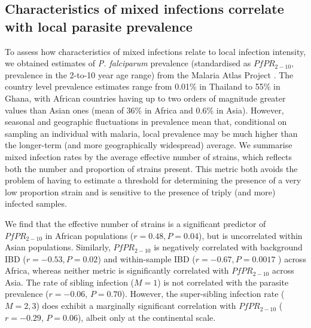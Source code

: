 \documentclass[9pt,lineno]{elife}
\begin{document}
\subsection{Characteristics of mixed infections correlate with local parasite prevalence}

To assess how characteristics of mixed infections relate to local infection intensity, we obtained estimates of {\it P. falciparum} prevalence (standardised as $PfPR_{2-10}$, prevalence in the 2-to-10 year age range) from the Malaria Atlas Project \citep[see Table~\ref{tab:Pf3k}]{MAP2017}. The country level prevalence estimates range from 0.01\% in Thailand to 55\% in Ghana, with African countries having up to two orders of magnitude greater values than Asian ones (mean of 36\% in Africa and 0.6\% in Asia). However, seasonal and geographic fluctuations in prevalence mean that, conditional on sampling an individual with malaria, local prevalence may be much higher than the longer-term (and more geographically widespread) average. We summarise mixed infection rates by the average effective number of strains, which reflects both the number and proportion of strains present.  This metric both avoids the problem of having to estimate a threshold for determining the presence of a very low proportion strain and is sensitive to the presence of triply (and more) infected samples.

We find that the effective number of strains is a significant predictor of $PfPR_{2-10}$ in African populations ($r=0.48, P=0.04$), but is uncorrelated within Asian populations. Similarly, $PfPR_{2-10}$ is negatively correlated with background IBD ($r = -0.53, P=0.02$) and within-sample IBD ($r= -0.67, P=0.0017$ ) across Africa, whereas neither metric is significantly correlated with $PfPR_{2-10}$ across Asia.  The rate of sibling infection ($M=1$) is not correlated with the parasite prevalence ($r=-0.06$, $P=0.70$). However, the super-sibling infection rate ($M=2, 3$) does exhibit a marginally significant correlation with $PfPR_{2-10}$ ($r=-0.29$, $P=0.06$), albeit only at the continental scale.
\end{document}
